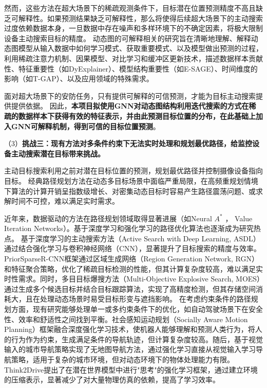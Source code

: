 然而，这些方法在超大场景下的稀疏观测条件下，目标潜在位置预测精度不高且缺乏可解释性。如果预测结果缺乏可解释性，那么将使得后续超大场景下的主动搜索过度依赖数据本身，一旦数据中存在噪声和多样环境下的不确定因素，将极大限制设备主动搜索目标的精度。
动态图的可解释相关的研究旨在清晰地理解、解释动态图模型从输入数据中如何学习模式、获取重要模式、以及模型做出预测的过程，利用稀疏注意力机制、因果模型\cite{zhao2024causality}、对比学习\cite{wang2024dyexplainer}和缓冲区更新技术，描述数据样本贡献性\cite{chen2023characterizing}、特征重要性（如DyExplainer\cite{wang2024dyexplainer}）、模型结构重要性（如E-SAGE\cite{wang2024esage}）、时间维度的影响（如T-GAP\cite{jung2021learning}）、以及应用领域的特殊需求。

面对超大场景下的安防任务，只有提供可解释的可信预测，才能为目标主动搜索提供提供依据。
因此，\textbf{本项目拟使用GNN对动态图结构利用迭代搜索的方式在稀疏的数据样本下获得有效的特征表示，并由此预测目标位置的分布，在此基础上加入GNN可解释机制，得到可信的目标位置预测}。


（3）\textbf{挑战三：现有方法对多条件约束下无法实时处理和规划最优路径，给监控设备主动搜索潜在目标带来挑战。}

主动目标搜索利用之前对潜在目标位置的预测，规划最优路径并控制摄像设备指向目标。
经典路径规划方法在动态多目标场景中面临严重局限，在高频重规划情境下算法的计算开销呈指数级增长\cite{bhardwaj2017learningheuristicsearchimitation}、对密集动态目标时容易产生路径震荡问题\cite{9154607}、或求解时间不可控\cite{10.1145/3272127.3275109}，难以满足实时需求。

近年来，数据驱动的方法在路径规划领域取得显著进展（如Neural $A^{\ast}$ \cite{Archetti_2022}， Value Iteration Networks\cite{tamar2017valueiterationnetworks}）。基于深度学习和强化学习的路径优化算法也逐渐成为研究热点\cite{zheng2023distributed,cui2024multi,fang2024improved}。
基于深度学习的主动搜索方法\cite{DBLP:conf/iclr/HottungKT22}（Active Search with Deep Learning, ASDL）通过结合强化学习与卷积神经网络（CNN），显著提升了目标搜索的精度与效率。
PriorSparseR-CNN框架\cite{wang2024priorsparse}通过区域生成网络（Region Generation Network, RGN）和特征聚合策略，优化了稀疏目标检测的性能，但其计算复杂度较高，难以满足实时性需求。同时，多目目标爆搜方法（Multi-Objective Explosive Search, MOES）\cite{moes2024}通过生成多个候选目标并结合目标跟踪算法，实现了高精度检测，但其存储空间消耗大，且在处理动态场景时易受目标形变与遮挡影响。
在考虑约束条件的路径规划方面，现有研究能够处理单一或多约束条件下的优化，如自动驾驶场景下在安全性、效率和舒适性之间找到平衡\cite{yang2019generalizedalgorithmmultiobjectivereinforcement}。社会感知运动规划\cite{DBLP:conf/iros/ChenELH17}（Socially Aware Motion Planning）框架融合深度强化学习技术，使机器人能够理解和预测人类行为，将人的行为作为约束，生成满足条件的导航轨迹，但计算复杂度较高。随后，基于视觉输入的城市导航策略\cite{mirowski2019learningnavigatecitiesmap}实现了无地图导航方法，通过强化学习直接从视觉输入学习导航策略，适用于复杂的城市环境，但对动态环境下的物体处理能力有限。
Think2Drive\cite{li2024think2driveefficientreinforcementlearning}提出了在潜在世界模型中进行"思考"的强化学习框架，通过建立环境的压缩表示，显著减少了对大量物理仿真的依赖，提高了学习效率。

